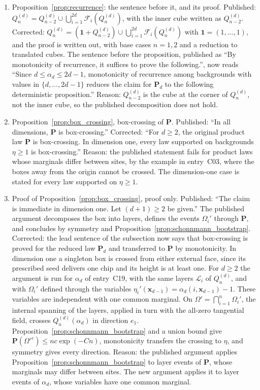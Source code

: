 \documentclass[12pt]{amsart}
\begin{document}
\begin{enumerate}
\item[C22.] Proposition~\ref{prop:recurrence}: the sentence before it, and its proof. Published: $Q_n^{(d)}=Q_{n-2}^{(d)}\cup\bigcup_{i=1}^{2d}\mathcal F_i(Q_n^{(d)})$, with the inner cube written as $Q_{n-2}^{(d)}$. Corrected: $Q_n^{(d)}=(\mathbf 1+Q_{n-2}^{(d)})\cup\bigcup_{i=1}^{2d}\mathcal F_i(Q_n^{(d)})$ with $\mathbf 1=(1,\ldots,1)$, and the proof is written out, with base cases $n=1,2$ and a reduction to translated cubes. The sentence before the proposition, published as ``By monotonicity of recurrence, it suffices to prove the following.'', now reads ``Since $d\leq\alpha_d\leq2d-1$, monotonicity of recurrence among backgrounds with values in $\{d,\ldots,2d-1\}$ reduces the claim for $\mathbf P_d$ to the following deterministic proposition.'' Reason: $Q_{n-2}^{(d)}$ is the cube at the corner of $Q_n^{(d)}$, not the inner cube, so the published decomposition does not hold.
\item[C23.] Proposition~\ref{prop:box_crossing}, box-crossing of $\mathbf P$. Published: ``In all dimensions, $\mathbf P$ is box-crossing.'' Corrected: ``For $d\geq2$, the original product law $\mathbf P$ is box-crossing. In dimension one, every law supported on backgrounds $\eta\geq1$ is box-crossing.'' Reason: the published statement fails for product laws whose marginals differ between sites, by the example in entry~C03, where the boxes away from the origin cannot be crossed. The dimension-one case is stated for every law supported on $\eta\geq1$.
\item[C24.] Proof of Proposition~\ref{prop:box_crossing}, proof only. Published: ``The claim is immediate in dimension one. Let $(d+1)\geq2$ be given.'' The published argument decomposes the box into layers, defines the events $\Omega_i'$ through $\mathbf P$, and concludes by symmetry and Proposition~\ref{prop:schonnmann_bootstrap}. Corrected: the lead sentence of the subsection now says that box-crossing is proved for the reduced law $\mathbf P_d$ and transferred to $\mathbf P$ by monotonicity. In dimension one a singleton box is crossed from either external face, since its prescribed seed delivers one chip and its height is at least one. For $d\geq2$ the argument is run for $\alpha_d$ of entry~C19, with the same layers $\mathcal L_i$ of $Q_n^{(d)}$, and with $\Omega_i'$ defined through the variables $\eta_i'(\mathbf x_{d-1})=\alpha_d(i,\mathbf x_{d-1})-1$. These variables are independent with one common marginal. On $\Omega'=\bigcap_{i=1}^n\Omega_i'$, the internal spanning of the layers, applied in turn with the all-zero tangential field, crosses $Q_n^{(d)}(\alpha_d)$ in direction $e_1$. Proposition~\ref{prop:schonnmann_bootstrap} and a union bound give $\mathbf P(\Omega'^c)\leq nc\exp(-Cn)$, monotonicity transfers the crossing to $\eta$, and symmetry gives every direction. Reason: the published argument applies Proposition~\ref{prop:schonnmann_bootstrap} to layer events of $\mathbf P$, whose marginals may differ between sites. The new argument applies it to layer events of $\alpha_d$, whose variables have one common marginal.

\end{enumerate}
\end{document}
